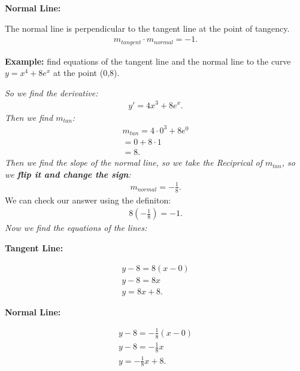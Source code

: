 \documentclass{report}
\begin{document}
  \pagebreak \bigbreak \noindent
  \begin{large}
    \textbf{Normal Line:}
  \end{large} 
  \bigbreak \noindent 
  The normal line is perpendicular to the tangent line at the point of tangency.
  \begin{align*}
    m_{tangent} \cdot m_{normal} = -1
  .\end{align*}
  \bigbreak \noindent 
  \bigbreak \noindent 
  \begin{mdframed}
    \textbf{Example:} find equations of the tangent line and the normal line to the curve $y=x^4 + 8e^x$ at the 
    point (0,8).
  \end{mdframed}
  \bigbreak \noindent 
  \textit{So we find the derivative:}
  \begin{align*}
    y\prime = 4x^3 + 8e^x
  .\end{align*}
  \bigbreak \noindent 
  \textit{Then we find $m_{tan}$:}
  \begin{align*}
    m_{tan} = 4 \cdot 0^3 + 8e^0 \\ 
    = 0 + 8 \cdot 1 \\ 
    = 8
  .\end{align*}
  \bigbreak \noindent 
  \textit{Then we find the slope of the normal line, so we take the Reciprical of $m_{tan}$, so we \textbf{\textit{flip it and change the sign}}:}
  \begin{align*}
    m_{normal} = - \frac{1}{8} 
  .\end{align*}
  \bigbreak \noindent 
  We can check our answer using the definiton:
  \begin{align*}
    8(- \frac{1}{8}) = -1
  .\end{align*}
  \bigbreak \noindent 
  \textit{Now we find the equations of the lines:}
  \begin{center}
    \textbf{Tangent Line:}
  \end{center}
  \begin{align*}
    y - 8 = 8(x - 0) \\ 
    y - 8 = 8x \\ 
    y = 8x + 8
  .\end{align*}
  \bigbreak \noindent 
  \begin{center}
    \textbf{Normal Line:}
  \end{center}
  \begin{align*}
    y - 8 = - \frac{1}{8}(x-0) \\ 
    y - 8 = - \frac{1}{8}x \\ 
    y = - \frac{1}{8}x + 8 
  .\end{align*}
\end{document}
